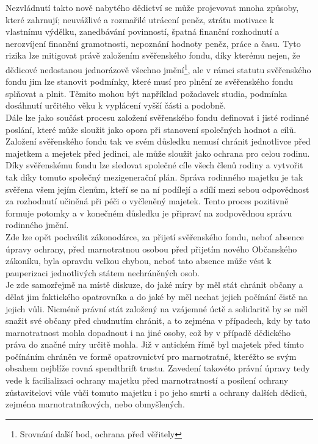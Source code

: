 \documentclass{article}
\begin{document}
 Nezvládnutí takto nově nabytého dědictví se může projevovat mnoha způsoby, které zahrnují; neuvážlivé a rozmařilé utrácení peněz, ztrátu motivace k vlastnímu výdělku, zanedbávání povinností, špatná finanční rozhodnutí a nerozvíjení finanční gramotnosti, nepoznání hodnoty peněz, práce a času. Tyto rizika lze mitigovat právě založením svěřenského fondu, díky kterému nejen, že dědicové nedostanou jednorázově všechno jmění\footnote{Srovnání další bod, ochrana před věřitely}, ale v rámci statutu svěřenského fondu jim lze stanovit podmínky, které musí pro plnění ze svěřenského fondu splňovat a plnit. Těmito mohou být například požadavek studia, podmínka dosáhnutí určitého věku k vyplácení vyšší části a podobně.\\
 
 Dále lze jako součást procesu založení svěřenského fondu definovat i jisté rodinné poslání, které může sloužit jako opora při stanovení společných hodnot a cílů. Založení svěřenského fondu tak ve svém důsledku nemusí chránit jednotlivce před majetkem a mejetek před jedinci, ale může sloužit jako ochrana pro celou rodinu. Díky svěřenskému fondu lze sledovat společné cíle všech členů rodiny a vytvořit tak díky tomuto společný mezigenerační plán. Správa rodinného majetku je tak svěřena všem jejím členům, kteří se na ní podílejí a sdílí mezi sebou odpovědnost za rozhodnutí učiněná při péči o vyčleněn\-ý majetek. Tento proces pozitivně formuje potomky a v konečném důsledku je připraví na zodpovědnou správu rodinného jmění.\\
 
 Zde lze opět pochválit zákonodárce, za přijetí svěřenského fondu, neboť absence úpravy ochrany, před marnotratnou osobou před přijetím nového Občanského zákoníku, byla opravdu velkou chybou, neboť tato absence může vést k pauperizaci jednotlivých státem nechráněných osob.\\
 
 Je zde samozřejmě na místě diskuze, do jaké míry by měl stát chránit občany a dělat jim faktického opatrovníka a do jaké by měl nechat jejich počínání čistě na jejich vůli. Nicméně právní stát založený na vzájemné úctě a solidaritě by se měl snažit své občany před chudnutím chránit, a to zejména v případech, kdy by tato marnotratnost mohla dopadnout i na jiné osoby, což by v případě dědického práva do značné míry určitě mohla. Již v antickém římě byl majetek před tímto počínáním chráněn ve formě opatrovnictví pro marnotratné, kteréžto se svým obsahem nejblíže rovná spendthrift trustu. Zavedení takovéto právní úpravy tedy vede k facilializaci ochrany majetku před marnotratností a posílení ochrany zůstavitelovi vůle vůči tomuto majetku i po jeho smrti a ochrany dalších dědiců, zejména marnotratníkových, nebo obmyšlených.\\
 
\end{document}
